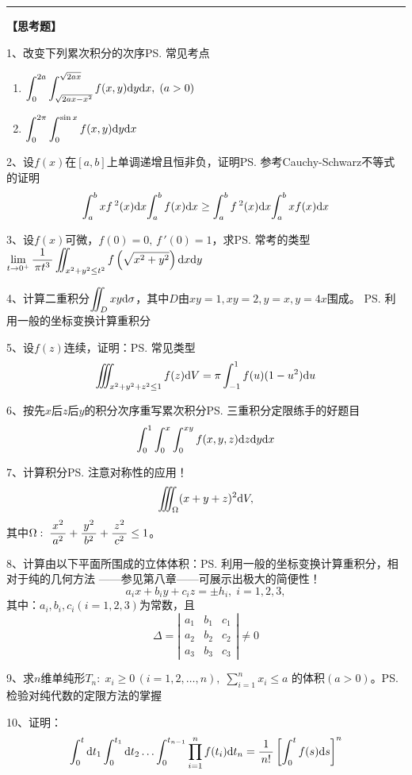 \bigskip

\hrule

\bigskip

{\bf 【思考题】}

1、改变下列累次积分的次序\ps{常见考点}
\begin{enumerate}[(1)]
  \setlength{\itemindent}{1cm}
  \item $\displaystyle\int_0^{2a}\displaystyle\int_{\sqrt{2ax-x^2}}^{\sqrt{2ax}}
  f(x,y)\mathrm{d} y\mathrm{d} x,\;(a>0)$ 
  \item $\displaystyle\int_0^{2\pi}\displaystyle\int_0^{\sin x}f(x,y)\mathrm{d} y\mathrm{d} x$
\end{enumerate}

2、设$f(x)$在$[a,b]$上单调递增且恒非负，证明\ps{参考Cauchy-Schwarz不等式的证明}
$${\displaystyle\int_a^b xf\,^2(x)\mathrm{d} x}{\displaystyle\int_a^b f(x)\mathrm{d} x}\geq
{\ensuremath{\displaystyle\int}_a^b f\,^2(x)\mathrm{d}x}{\ensuremath{\displaystyle\int}_a^b xf(x)\mathrm{d}x}$$

3、设$f(x)$可微，$f(0)=0,\,f\,'(0)=1$，求\ps{常考的类型}
$\lim\limits_{t\to 0^+}\displaystyle\frac{\,{1}\,}{\,{\pi t^3}\,}
\iint_{x^2+y^2\leq t^2}f\left(
\sqrt{x^2+y^2}\right)\mathrm{d} x\mathrm{d} y$

4、计算二重积分$\displaystyle\iint_D xy\mathrm{d}\sigma$，其中$D$由$xy=1,xy=2,y=x,y=4x$围成。
\ps{利用一般的坐标变换计算重积分} 

5、设$f(z)$连续，证明：\ps{常见类型}
$$\iiint_{x^2+y^2+z^2\leq 1}f(z)\mathrm{d} V=\pi\displaystyle\int_{-1}^1f(u)(1-u^2)\mathrm{d} u$$

6、按先$x$后$z$后$y$的积分次序重写累次积分\ps{三重积分定限练手的好题目}
$$\displaystyle\int_0^1\displaystyle\int_0^x\displaystyle\int_0^{xy}f(x,y,z)\mathrm{d} z\mathrm{d} y\mathrm{d} x$$

7、计算积分\ps{注意对称性的应用！}
$$\iiint_{\Omega}(x+y+z)^2\mathrm{d} V,$$
其中$\Omega:\;\displaystyle\frac{\,{x^2}\,}{\,{a^2}\,}+\displaystyle\frac{\,{y^2}\,}{\,{b^2}\,}+\displaystyle\frac{\,{z^2}\,}{\,{c^2}\,}\leq 1$。

8、计算由以下平面所围成的立体体积：\ps{利用一般的坐标变换计算重积分，相对于纯的几何方法
——参见第八章——可展示出极大的简便性！}
$$a_ix+b_iy+c_iz=\pm h_i,\;i=1,2,3,$$
其中：$a_i,b_i,c_i(i=1,2,3)$为常数，且
$$\Delta=\left|\begin{array}{ccc}
a_1 & b_1 & c_1\\ a_2 & b_2 & c_2 \\ a_3 & b_3 & c_3
\end{array}\right|\ne 0$$

9、求$n$维单纯形$T_n:\; x_i\geq 0\,(i=1,2,\ldots,n),\;
\sum\limits_{i=1}^nx_i\leq a$
的体积$(a>0)$。\ps{检验对纯代数的定限方法的掌握}

10、证明：
$$\displaystyle\int_0^t\mathrm{d} t_1\displaystyle\int_0^{t_1}\mathrm{d} t_2\ldots
\displaystyle\int_0^{t_{n-1}}\prod\limits_{i=1}^nf(t_i)\mathrm{d} t_n
=\displaystyle\frac{\,{1}\,}{\,{n!}\,}\left[\displaystyle\int_0^tf(s)\mathrm{d} s\right]^n$$

